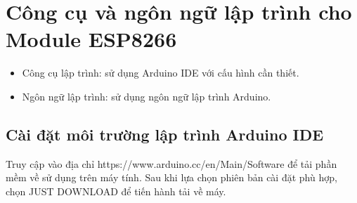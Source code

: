 \section{Công cụ và ngôn ngữ lập trình cho Module ESP8266}
    \begin{itemize}
        \item Công cụ lập trình: sử dụng Arduino IDE với cấu hình cần thiết.
        \item Ngôn ngữ lập trình: sử dụng ngôn ngữ lập trình Arduino.
    \end{itemize}
\subsection{Cài đặt môi trường lập trình Arduino IDE}
    Truy cập vào địa chỉ https://www.arduino.cc/en/Main/Software để tải phần mềm về sử dụng trên máy tính. Sau khi lựa chọn phiên bản cài đặt phù hợp, chọn JUST DOWNLOAD để tiến hành tải về máy.
